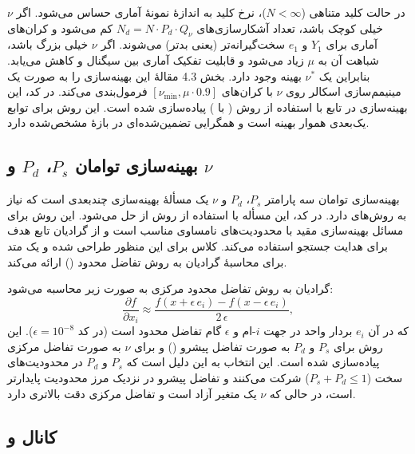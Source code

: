 در حالت کلید متناهی ($N < \infty$)، نرخ کلید به اندازۀ نمونۀ آماری  حساس می‌شود. اگر $\nu$ خیلی کوچک باشد، تعداد آشکارسازی‌های  $N_d = N \cdot P_d \cdot Q_\nu$ کم می‌شود و کران‌های آماری برای $Y_1$ و $e_1$ سخت‌گیرانه‌تر (یعنی بدتر) می‌شوند. اگر $\nu$ خیلی بزرگ باشد، شباهت آن به $\mu$ زیاد می‌شود و قابلیت تفکیک آماری بین سیگنال و  کاهش می‌یابد. بنابراین یک $\nu^*$ بهینه وجود دارد. بخش 4.3 مقالۀ  این بهینه‌سازی را به صورت یک مینیمم‌سازی اسکالر روی $\nu$ با کران‌های $[\nu_{\min}, \mu \cdot 0.9]$ فرمول‌بندی می‌کند. در کد، این بهینه‌سازی در تابع  با استفاده از روش  ( با ) پیاده‌سازی شده است. این روش برای توابع یک‌بعدی هموار بهینه است و همگرایی تضمین‌شده‌ای در بازۀ مشخص‌شده دارد.

\subsection{بهینه‌سازی توامان $P_s$، $P_d$ و $\nu$}

بهینه‌سازی توامان سه پارامتر $P_s$، $P_d$ و $\nu$ یک مسألۀ بهینه‌سازی چندبعدی است که نیاز به روش‌های  دارد. در کد، این مسأله با استفاده از روش  از  حل می‌شود. این روش برای مسائل بهینه‌سازی مقید با محدودیت‌های نامساوی مناسب است و از گرادیان تابع هدف برای هدایت جستجو استفاده می‌کند. کلاس  برای این منظور طراحی شده و یک متد  برای محاسبۀ گرادیان به روش تفاضل محدود () ارائه می‌کند. 

گرادیان به روش تفاضل محدود مرکزی به صورت زیر محاسبه می‌شود:
\begin{equation}
	\frac{\partial f}{\partial x_i} \approx \frac{f(x + \epsilon\,e_i) - f(x - \epsilon\,e_i)}{2\,\epsilon},
\end{equation}
که در آن $e_i$ بردار واحد در جهت $i$-ام و $\epsilon$ گام تفاضل محدود است (در کد $\epsilon = 10^{-8}$). این روش برای $P_s$ و $P_d$ به صورت تفاضل پیشرو () و برای $\nu$ به صورت تفاضل مرکزی پیاده‌سازی شده است. این انتخاب به این دلیل است که $P_s$ و $P_d$ در محدودیت‌های سخت ($P_s + P_d \le 1$) شرکت می‌کنند و تفاضل پیشرو در نزدیک مرز محدودیت پایدارتر است، در حالی که $\nu$ یک متغیر آزاد است و تفاضل مرکزی دقت بالاتری دارد.

\subsection{کانال  و }

